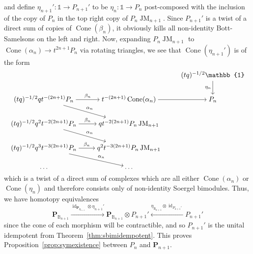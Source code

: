 \documentclass[11pt]{article}
\DeclareMathOperator{\Cone}{Cone}
\DeclareMathOperator{\id}{id}
\DeclareMathOperator{\JM}{JM}
\theoremstyle{definition}
\theoremstyle{remark}
\numberwithin{equation}{section}
\begin{document}
and define $\eta_{n+1}':\mathbb{1}\to P_{n+1}'$ to
be $\eta_n:\mathbb{1}\to
P_{n}$ post-composed with the inclusion of the copy of
$P_n$ in the top right copy of $P_{n}\JM_{n+1}$. Since $P_{n+1}'$
is a twist of a direct sum of copies of $\Cone(\beta_n)$, it obviously kills
all non-identity Bott-Samelsons on the left and right. Now, expanding
$P_n\JM_{n+1}$ to $\Cone(\alpha_n)\to t^{2n+1}P_n$ via rotating triangles, we
see that $\Cone(\eta_{n+1}')$ is of the form
\[\begin{tikzcd}[ampersand replacement=\&,cramped]
	\&\& {(tq)^{-1/2}\mathbb{1}} \\
	{(tq)^{-1/2}qt^{-(2n+1)}P_{n}} \& {t^{-(2n+1)}\Cone(\alpha_n)} \& {P_n} \\
	{(tq)^{-1/2}q^2t^{-2(2n+1)}P_{n}} \& {qt^{-2(2n+1)}P_{n}\JM_{n+1}} \\
	{(tq)^{-1/2}q^3t^{-3(2n+1)}P_{n}} \& {q^2t^{-3(2n+1)}P_{n}\JM_{n+1}} \\
	\dots \& \dots
	\arrow["{\eta_n}"', from=1-3, to=2-3]
	\arrow["{{\beta_n}}", from=2-1, to=2-2]
	\arrow["{{\alpha_n}}", from=2-1, to=3-2]
	\arrow[from=2-2, to=2-3]
	\arrow["{{\beta_n}}", from=3-1, to=3-2]
	\arrow["{{\alpha_n}}", from=3-1, to=4-2]
	\arrow["{{\beta_n}}", from=4-1, to=4-2]
	\arrow["{{\alpha_n}}", from=4-1, to=5-2]
\end{tikzcd}\]
which is a twist of a direct sum of complexes which are all
either $\Cone(\alpha_n)$ or $\Cone(\eta_n)$ and therefore consists only of
non-identity Soergel bimodules. Thus, we have homotopy equivalences
\[\mathbf{P}_{\mathbb{B}_{n+1}}
	\xrightarrow{\id_{\mathbf{P}_{\mathbb{B}_{n+1}}} \otimes
	\eta_{n+1}'} \mathbf{P}_{\mathbb{B}_{n+1}}\otimes P_{n+1}'
	\xleftarrow{\eta_{\mathbb{B}_{n+1}} \otimes \id_{P_{n+1}'}} P_{n+1}'
\]
since the cone of each morphism will be contractible, and so
$P_{n+1}'$ is the unital idempotent from
Theorem~\ref{thm:sbimidempotent}. This proves
Proposition~\ref{prop:symexistence} between $P_n$ and
$\mathbf{P}_{n+1}$.
\end{document}
